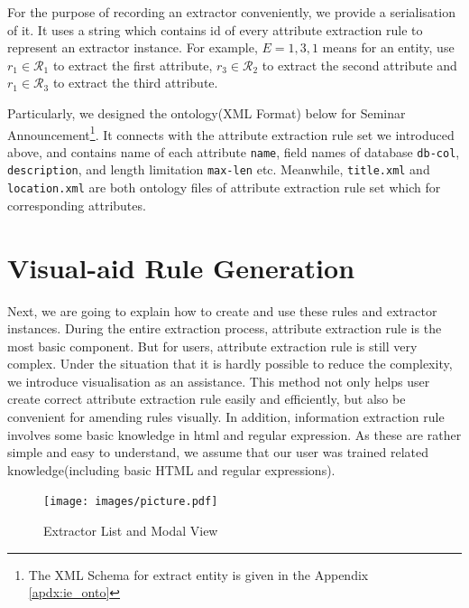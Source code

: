 For the purpose of recording an extractor conveniently, we provide a serialisation of it. It uses a string which contains id of every attribute extraction rule to represent an extractor instance. For example, $E=1,3,1$ means for an entity, use $r_1 \in \mathcal{R}_1$ to extract the first attribute, $r_3 \in \mathcal{R}_2$ to extract the second attribute and $r_1 \in \mathcal{R}_3$ to extract the third attribute.

Particularly, we designed the ontology(XML Format) below for Seminar Announcement\footnote{The XML Schema for extract entity is given in the Appendix \ref{apdx:ie_onto}}. It connects with the attribute extraction rule set we introduced above, and contains name of each attribute \texttt{name}, field names of database \texttt{db-col}, \texttt{description}, and length limitation \texttt{max-len} etc. Meanwhile, \texttt{title.xml} and \texttt{location.xml} are both ontology files of attribute extraction rule set which for corresponding attributes.



\section{Visual-aid Rule Generation}
Next, we are going to explain how to create and use these rules and extractor instances. During the entire extraction process, attribute extraction rule is the most basic component. But for users, attribute extraction rule is still very complex. Under the situation that it is hardly possible to reduce the complexity, we introduce visualisation as an assistance. This method not only helps user create correct attribute extraction rule easily and efficiently, but also be convenient for amending rules visually. In addition, information extraction rule involves some basic knowledge in html and regular expression. As these are rather simple and easy to understand, we assume that our user was trained related knowledge(including basic HTML and regular expressions).
\begin{figure}[htb!]
	\centering
	\texttt{[image: images/picture.pdf]}
	\caption{Extractor List and Modal View}\label{fig:ext:list_and_modal}
\end{figure}

